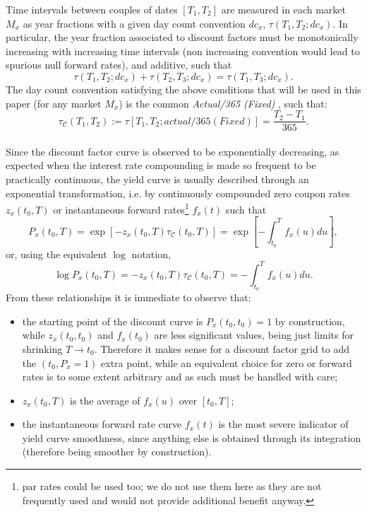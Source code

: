 \documentclass[11pt,reqno]{amsart}
\begin{document}
Time intervals between couples of dates $\left[T_{1},T_{2}\right]$ are measured in each market $M_{x}$ as year fractions with a given day count convention $dc_x$, $\tau\left(T_{1},T_{2};dc_x\right)$.
In particular, the year fraction associated to discount factors must be monotonically increasing with increasing time intervals (non increasing convention would lead to spurious null forward rates), and additive, such that
\begin{equation}
\tau\left(T_{1},T_{2};dc_x\right) + \tau\left(T_{2},T_{3};dc_x\right)
= \tau\left(T_{1},T_{3};dc_x\right).
\end{equation}
The day count convention satisfying the above conditions that will be used in this paper (for any market $M_x$) is the common \emph{Actual/365 (Fixed)} \cite{ISDA}, such that:
\begin{equation}
\tau_{\mathcal{C}}\left(T_{1},T_{2}\right) 
:= \tau\left[T_{1},T_{2};actual/365 (Fixed)\right]
= \frac{T_2-T_1}{365}.
\end{equation}
\\ 
Since the discount factor curve is observed to be exponentially decreasing, as expected when the interest rate compounding is made so frequent to be practically continuous, the yield curve is usually described through an exponential transformation, i.e. by continuously compounded zero coupon rates $z_x(t_0,T)$ or instantaneous forward rates\footnote{par rates could be used too; we do not use them here as they are not frequently used and would not provide additional benefit anyway.} $f_x(t)$ such that
\begin{equation}
P_x(t_0,T) 
= \exp\left[-z_x\left(t_0,T\right)\tau_{\mathcal{C}}\left(t_0,T\right)\right]
= \exp\left[-\int_{t_0}^{T}f_x\left(u\right)du\right],
\label{eqn:relationship}
\end{equation}
or, using the equivalent $\log$ notation,
\begin{equation}
\log P_x(t_0,T)
= -z_x\left(t_0,T\right)\tau_{\mathcal{C}}\left(t_0,T\right)
= -\int_{t_0}^{T}f_x\left(u\right)du.
\label{eqn:logrelationship}
\end{equation}
From these relationships it is immediate to observe that:
\begin{itemize}
\item the starting point of the discount curve is $P_x(t_0,t_0)=1$ by construction, while $z_x\left(t_0,t_0\right) $ and $f_x\left(t_0\right)$ are less significant values, being just limits for shrinking $T\rightarrow t_0$. Therefore it makes sense for a discount factor grid to add the $\left(t_0,P_x=1\right)$ extra point, while an equivalent choice for zero or forward rates is to some extent arbitrary and as such must be handled with care;
\item $z_x\left(t_0,T\right)$ is the average of $f_x\left(u\right)$ over $\left[t_0,T\right]$;
\item the instantaneous forward rate curve $f_x\left(t\right)$ is the most severe indicator of yield curve smoothness, since anything else is obtained through its integration (therefore being smoother by construction).
\end{itemize}
\end{document}

